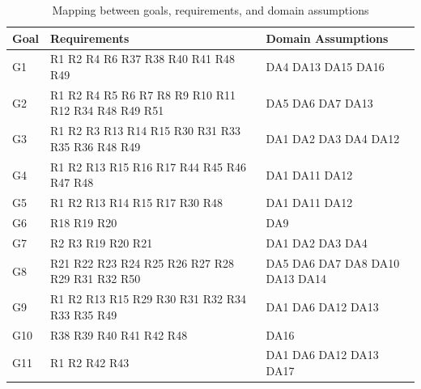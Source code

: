 \begin{table}[H]
  \begin{tabular}{|l|p{9cm}|p{5cm}| }
    \hline
    \textbf{Goal} & \textbf{Requirements} & \textbf{Domain Assumptions}      \\
    \hline
    G1 & R1 R2 R4 R6 R37 R38 R40 R41 R48 R49 & DA4 DA13 DA15 DA16 \\
    \hline
    G2 & R1 R2 R4 R5 R6 R7 R8 R9 R10 R11 R12 R34 R48 R49 R51 & DA5 DA6 DA7 DA13 \\
    \hline
    G3 & R1 R2 R3 R13 R14 R15 R30 R31 R33 R35 R36 R48 R49 & DA1 DA2 DA3 DA4 DA12 \\
    \hline
    G4 & R1 R2 R13 R15 R16 R17 R44 R45 R46 R47 R48 & DA1 DA11 DA12 \\
    \hline
    G5 & R1 R2 R13 R14 R15 R17 R30 R48 & DA1 DA11 DA12 \\
    \hline
    G6 & R18 R19 R20 & DA9 \\
    \hline
    G7 & R2 R3 R19 R20 R21 & DA1 DA2 DA3 DA4 \\
    \hline
    G8 & R21 R22 R23 R24 R25 R26 R27 R28 R29 R31 R32 R50 & DA5 DA6 DA7 DA8 DA10 DA13 DA14 \\
    \hline
    G9 & R1 R2 R13 R15 R29 R30 R31 R32 R34 R33 R35 R49 & DA1 DA6 DA12 DA13 \\
    \hline
    G10 & R38 R39 R40 R41 R42 R48 & DA16 \\
    \hline
    G11 & R1 R2 R42 R43 & DA1 DA6 DA12 DA13 DA17 \\
    \hline
  \end{tabular}
  \caption{Mapping between goals, requirements, and domain assumptions}
  \label{tab:mapping}
\end{table}

